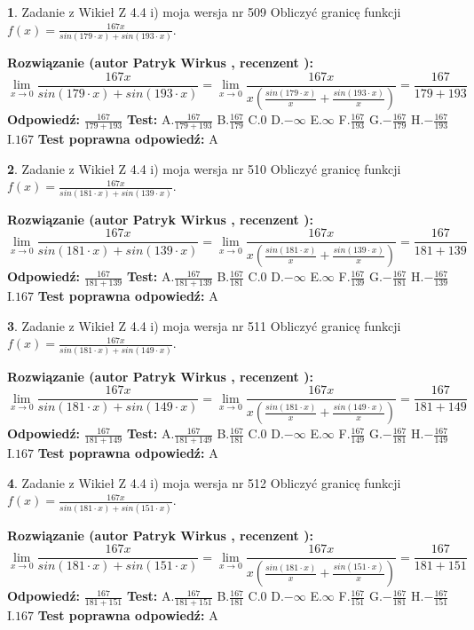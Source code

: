 \documentclass[12pt, a4paper]{article}
\theoremstyle{definition} %
\newtheorem{zad}{}
\newcommand{\zadStart}[1]{\begin{zad}#1\newline}
\newcommand{\zadStop}{\end{zad}}
\newcommand{\rozwStart}[2]{\noindent \textbf{Rozwiązanie (autor #1 , recenzent #2): }\newline}
\newcommand{\rozwStop}{\newline}
\newcommand{\odpStart}{\noindent \textbf{Odpowiedź:}\newline}
\newcommand{\odpStop}{\newline}
\newcommand{\testStart}{\noindent \textbf{Test:}\newline}
\newcommand{\testStop}{\newline}
\newcommand{\kluczStart}{\noindent \textbf{Test poprawna odpowiedź:}\newline}
\newcommand{\kluczStop}{\newline}
\begin{document}
\zadStart{Zadanie z Wikieł Z 4.4 i) moja wersja nr 509}
Obliczyć granicę funkcji $f(x)=\frac{167x}{sin(179\cdot x) +sin(193\cdot x)}$.
\zadStop
\rozwStart{Patryk Wirkus}{}
$$\lim\limits_{x\to 0}\frac{167x}{sin(179\cdot x) +sin(193\cdot x)}=\lim\limits_{x\to 0}\frac{167x}{x(\frac{sin(179\cdot x)}{x}+\frac{sin(193\cdot x)}{x})}=\frac{167}{179+193}$$
\rozwStop
\odpStart
$\frac{167}{179+193}$
\odpStop
\testStart
A.$\frac{167}{179+193}$
B.$\frac{167}{179}$
C.$0$
D.$-\infty$
E.$\infty$
F.$\frac{167}{193}$
G.$-\frac{167}{179}$
H.$-\frac{167}{193}$
I.$167$
\testStop
\kluczStart
A
\kluczStop



\zadStart{Zadanie z Wikieł Z 4.4 i) moja wersja nr 510}
Obliczyć granicę funkcji $f(x)=\frac{167x}{sin(181\cdot x) +sin(139\cdot x)}$.
\zadStop
\rozwStart{Patryk Wirkus}{}
$$\lim\limits_{x\to 0}\frac{167x}{sin(181\cdot x) +sin(139\cdot x)}=\lim\limits_{x\to 0}\frac{167x}{x(\frac{sin(181\cdot x)}{x}+\frac{sin(139\cdot x)}{x})}=\frac{167}{181+139}$$
\rozwStop
\odpStart
$\frac{167}{181+139}$
\odpStop
\testStart
A.$\frac{167}{181+139}$
B.$\frac{167}{181}$
C.$0$
D.$-\infty$
E.$\infty$
F.$\frac{167}{139}$
G.$-\frac{167}{181}$
H.$-\frac{167}{139}$
I.$167$
\testStop
\kluczStart
A
\kluczStop



\zadStart{Zadanie z Wikieł Z 4.4 i) moja wersja nr 511}
Obliczyć granicę funkcji $f(x)=\frac{167x}{sin(181\cdot x) +sin(149\cdot x)}$.
\zadStop
\rozwStart{Patryk Wirkus}{}
$$\lim\limits_{x\to 0}\frac{167x}{sin(181\cdot x) +sin(149\cdot x)}=\lim\limits_{x\to 0}\frac{167x}{x(\frac{sin(181\cdot x)}{x}+\frac{sin(149\cdot x)}{x})}=\frac{167}{181+149}$$
\rozwStop
\odpStart
$\frac{167}{181+149}$
\odpStop
\testStart
A.$\frac{167}{181+149}$
B.$\frac{167}{181}$
C.$0$
D.$-\infty$
E.$\infty$
F.$\frac{167}{149}$
G.$-\frac{167}{181}$
H.$-\frac{167}{149}$
I.$167$
\testStop
\kluczStart
A
\kluczStop



\zadStart{Zadanie z Wikieł Z 4.4 i) moja wersja nr 512}
Obliczyć granicę funkcji $f(x)=\frac{167x}{sin(181\cdot x) +sin(151\cdot x)}$.
\zadStop
\rozwStart{Patryk Wirkus}{}
$$\lim\limits_{x\to 0}\frac{167x}{sin(181\cdot x) +sin(151\cdot x)}=\lim\limits_{x\to 0}\frac{167x}{x(\frac{sin(181\cdot x)}{x}+\frac{sin(151\cdot x)}{x})}=\frac{167}{181+151}$$
\rozwStop
\odpStart
$\frac{167}{181+151}$
\odpStop
\testStart
A.$\frac{167}{181+151}$
B.$\frac{167}{181}$
C.$0$
D.$-\infty$
E.$\infty$
F.$\frac{167}{151}$
G.$-\frac{167}{181}$
H.$-\frac{167}{151}$
I.$167$
\testStop
\kluczStart
A
\kluczStop
\end{document}

